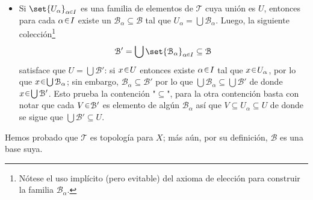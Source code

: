 \begin{sol}[Demostración]
\begin{itemize}
\item Si $\set{U_\alpha}_{\alpha \en I}$ es una familia de elementos de $\mathcal{T}$ cuya unión es $U$, entonces para cada $\alpha \en I$ existe un $\mathcal{B}_\alpha \subseteq \mathcal{B}$ tal que $U_\alpha = \bigcup \mathcal{B}_\alpha$. Luego, la siguiente colección\footnote{Nótese el uso implícito (pero evitable) del axioma de elección para construir la familia $\mathcal{B}_\alpha$.}
\[
    \mathcal{B}'%
    = \bigcup \set{\mathcal{B}_\alpha}_{\alpha \en I}%
    \subseteq \mathcal{B}
\]
satisface que $U = \bigcup \mathcal{B}'$: si $x \en U$ entonces existe $\alpha \en I$ tal que $x \en U_\alpha$, por lo que $x \en \bigcup \mathcal{B}_\alpha$; sin embargo, $\mathcal{B}_\alpha \subseteq \mathcal{B}'$ por lo que $\bigcup \mathcal{B}_\alpha \subseteq \bigcup \mathcal{B}'$ de donde $x \en \bigcup\mathcal{B}'$. Esto prueba la contención "$\subseteq$", para la otra contención basta con notar que cada $V \en \mathcal{B}'$ es elemento de algún $\mathcal{B}_\alpha$ así que $V \subseteq U_\alpha \subseteq U$ de donde se sigue que $\bigcup \mathcal{B}' \subseteq U$.
\end{itemize}
Hemos probado que $\mathcal{T}$ es topología para $X$; más aún, por su definición, $\mathcal{B}$ es una base suya.
\end{sol}

